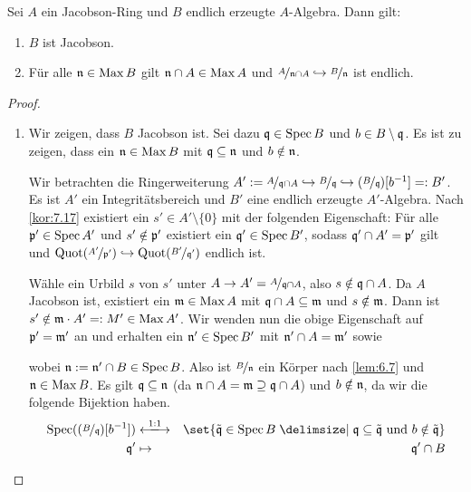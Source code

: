 \documentclass[12pt,a4paper]{scrartcl}
\theoremstyle{cplain}
\theoremstyle{cdef}
\begin{document}
\begin{satz} \label{thm:7.22}
	Sei $A$ ein Jacobson-Ring und $B$ endlich erzeugte $A$-Algebra. Dann gilt:
	\begin{enumerate}
		\item $B$ ist Jacobson. \label{thm:7.22:i}
		\item Für alle $\mathfrak{n} \in \operatorname{Max} B$ gilt $\mathfrak{n} \cap A \in \operatorname{Max} A$ und $\nicefrac{A}{\mathfrak{n} \cap A} \hookrightarrow \nicefrac{B}{\mathfrak{n}}$ ist endlich. \label{thm:7.22:ii}
	\end{enumerate}
\end{satz}
\begin{proof}
	\leavevmode
	\begin{enumerate}[label=\ref{thm:7.22:\roman*}]
		\item Wir zeigen, dass $B$ Jacobson ist. Sei dazu $\mathfrak{q} \in \operatorname{Spec} B$ und $b \in B \setminus \mathfrak{q}$. Es ist zu zeigen, dass ein $\mathfrak{n} \in \operatorname{Max} B$ mit $\mathfrak{q} \subseteq \mathfrak{n}$ und $b \notin \mathfrak{n}$.
		
		Wir betrachten die Ringerweiterung $A' := \nicefrac{A}{\mathfrak{q} \cap A} \hookrightarrow \nicefrac{B}{\mathfrak{q}} \hookrightarrow (\nicefrac{B}{\mathfrak{q}})[b^{-1}] =: B'$. Es ist $A'$ ein Integritätsbereich und $B'$ eine endlich erzeugte $A'$-Algebra. Nach \cref{kor:7.17} existiert ein $s' \in A' \setminus \{0\}$ mit der folgenden Eigenschaft: Für alle $\mathfrak{p}' \in \operatorname{Spec} A'$ und $s' \notin \mathfrak{p}'$ existiert ein $\mathfrak{q}' \in \operatorname{Spec} B'$, sodass $\mathfrak{q}' \cap A' = \mathfrak{p}'$ gilt und $\operatorname{Quot}(\nicefrac{A'}{\mathfrak{p}'}) \hookrightarrow \operatorname{Quot}(\nicefrac{B'}{\mathfrak{q}'})$ endlich ist.
		
		Wähle ein Urbild $s$ von $s'$ unter $A \to A' = \nicefrac{A}{\mathfrak{q} \cap A}$, also $s \notin \mathfrak{q} \cap A$. Da $A$ Jacobson ist, existiert ein $\mathfrak{m} \in \operatorname{Max} A$ mit $\mathfrak{q} \cap A \subseteq \mathfrak{m}$ und $s \notin \mathfrak{m}$. Dann ist $s' \notin \mathfrak{m} \cdot A' =: M' \in \operatorname{Max} A'$. Wir wenden nun die obige Eigenschaft auf $\mathfrak{p}'=\mathfrak{m}'$ an und erhalten ein $\mathfrak{n}' \in \operatorname{Spec} B'$ mit $\mathfrak{n}' \cap A = \mathfrak{m}'$ sowie 
		\begin{center}
		\end{center} wobei $\mathfrak{n} := \mathfrak{n}' \cap B \in \operatorname{Spec} B$. Also ist $\nicefrac{B}{\mathfrak{n}}$ ein Körper nach \cref{lem:6.7} und $\mathfrak{n} \in \operatorname{Max} B$.
		Es gilt $\mathfrak{q} \subseteq \mathfrak{n}$ (da $\mathfrak{n} \cap A = \mathfrak{m} \supseteq \mathfrak{q} \cap A$) und $b \notin \mathfrak{n}$, da wir die folgende Bijektion haben. \begin{eqnarray*}
			\Spec((\fak B\fq)[b^{-1}]) &\xlongleftrightarrow{1:1}& \set{\tilde \fq \in \Spec B \given \fq \subseteq \tilde \fq \text{ und } b \notin \tilde \fq} \\
			\fq'& \mapsto &\fq' \cap B
		\end{eqnarray*}


\end{enumerate}
\end{proof}
\end{document}
